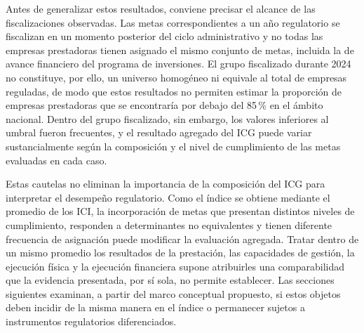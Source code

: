 Antes de generalizar estos resultados, conviene precisar el alcance de las fiscalizaciones observadas. Las metas correspondientes a un año regulatorio se fiscalizan en un momento posterior del ciclo administrativo y no todas las empresas prestadoras tienen asignado el mismo conjunto de metas, incluida la de avance financiero del programa de inversiones. El grupo fiscalizado durante 2024 no constituye, por ello, un universo homogéneo ni equivale al total de empresas reguladas, de modo que estos resultados no permiten estimar la proporción de empresas prestadoras que se encontraría por debajo del 85\,\% en el ámbito nacional. Dentro del grupo fiscalizado, sin embargo, los valores inferiores al umbral fueron frecuentes, y el resultado agregado del ICG puede variar sustancialmente según la composición y el nivel de cumplimiento de las metas evaluadas en cada caso.

Estas cautelas no eliminan la importancia de la composición del ICG para interpretar el desempeño regulatorio. Como el índice se obtiene mediante el promedio de los ICI, la incorporación de metas que presentan distintos niveles de cumplimiento, responden a determinantes no equivalentes y tienen diferente frecuencia de asignación puede modificar la evaluación agregada. Tratar dentro de un mismo promedio los resultados de la prestación, las capacidades de gestión, la ejecución física y la ejecución financiera supone atribuirles una comparabilidad que la evidencia presentada, por sí sola, no permite establecer. Las secciones siguientes examinan, a partir del marco conceptual propuesto, si estos objetos deben incidir de la misma manera en el índice o permanecer sujetos a instrumentos regulatorios diferenciados.
